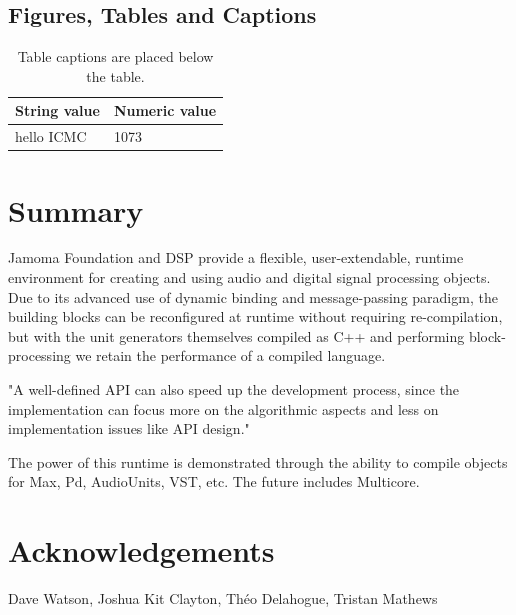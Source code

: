 \documentclass[twoside,10pt]{article}
\begin{document}
\subsection{Figures, Tables and Captions}

\begin{table}[htbp]
\begin{center}
\begin{tabular}{|l|l|}
\hline
String value & Numeric value \\
\hline
hello ICMC  & 1073 \\
\hline
\end{tabular}
\end{center}
\caption{Table captions are placed below the table.}
\label{tab:example}
\end{table}




\section{Summary} %

Jamoma Foundation and DSP provide a flexible, user-extendable, runtime environment for creating and using audio and digital signal processing objects.  Due to its advanced use of dynamic binding and message-passing paradigm, the building blocks can be reconfigured at runtime without requiring re-compilation, but with the unit generators themselves compiled as C++ and performing block-processing we retain the performance of a compiled language.


"A well-defined API can also speed up the development process, since the implementation can focus more on the algorithmic aspects and less on implementation issues like API design." \cite{Lerch:2005}

The power of this runtime is demonstrated through the ability to compile objects for Max, Pd, AudioUnits, VST, etc.  The future includes Multicore.






\section{Acknowledgements} %

Dave Watson, Joshua Kit Clayton, Théo Delahogue, Tristan Mathews




\end{document}
